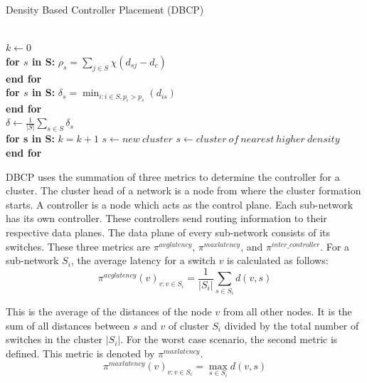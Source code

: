 \documentclass[times]{dacauth}
\begin{document}
\begin{algorithm}
	\caption{Density Based Controller Placement (DBCP)}\label{algo:dbcp}
	\begin{algorithmic}[1]
		 \\
		$k \gets 0$ \\
		\textbf{for $s$ in S:}
		\State $\rho_s=\sum_{j\in S}\chi(d_{sj}-d_c)$ \\
		\textbf{end for} \\
		\textbf{for $s$ in S:}
		\State $\delta_s=\min_{i:i\in S,p_i>p_s}(d_{is})$ \\
		\textbf{end for} \\
		$\delta \gets \frac{1}{|S|}\sum_{s\in S}\delta_s$ \\
		\textbf{for s in S:}
		\State $k = k + 1$
		\State $s \gets new~cluster$
		\Else
		\State $s \gets cluster~of~nearest~higher~density$
		\EndIf \\
		\textbf{end for}
		\EndProcedure
	\end{algorithmic}
\end{algorithm}

\smallskip
DBCP uses the summation of three metrics to determine the controller for a cluster. The cluster head of a network is a node from where the cluster formation starts. A controller is a node which acts as the control plane. Each sub-network has its own controller. These controllers send routing information to their respective data planes. The data plane of every sub-network consists of its switches. These three metrics are $\pi^{avglatency}$, $\pi^{maxlatency}$, and $\pi^{inter\_controller}$. For a sub-network $S_i$, the average latency for a switch $v$ is calculated as follows:
\begin{equation}	\label{eqn:avglat}
\pi^{avglatency}(v)_{v:v\in S_i} = \frac{1}{|S_i|} \sum_{s\in S_i}d(v,s)
\end{equation}

This is the average of the distances of the node $v$ from all other nodes. It is the sum of all distances between $s$ and $v$ of cluster $S_i$ divided by the total number of switches in the cluster $|S_i|$.
For the worst case scenario, the second metric is defined. This metric is denoted by $\pi^{maxlatency}$.
\begin{equation}	\label{eqn:maxlat}
\pi^{maxlatency}(v)_{v:v\in S_i} = \max_{s\in S_i}d(v,s)
\end{equation}
\end{document}
